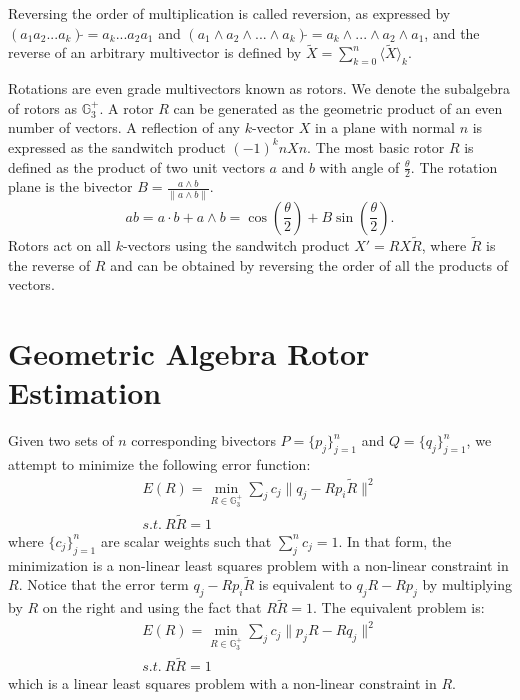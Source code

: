 \documentclass{birkjour}
\numberwithin{equation}{section}
\begin{document}
Reversing the order of multiplication is called reversion, as expressed by $(a_1 a_2 ... a_k)\tilde{} = a_k ... a_2 a_1$ and $(a_1 \wedge a_2 \wedge ... \wedge a_k)\tilde{} = a_k \wedge ... \wedge a_2 \wedge a_1$, and the reverse of an arbitrary multivector is defined by $\tilde{X} = \sum_{k=0}^n { \langle \tilde{X} \rangle_k }$.

Rotations are even grade multivectors known as rotors. We denote the subalgebra of rotors as $\mathbb{G}^{+}_3$. A rotor $R$ can be generated as the geometric product of an even number of vectors. A reflection of any $k$-vector $X$ in a plane with normal $n$ is expressed as the sandwitch product $(-1)^k n X n$. The most basic rotor $R$ is defined as the product of two unit vectors $a$ and $b$ with angle of $\frac{\theta}{2}$. The rotation plane is the bivector $B = \frac{a \wedge b}{\| a \wedge b \|}$.
\begin{equation*}
a b = a \cdot b + a \wedge b = \cos\left( \frac{\theta}{2} \right) + B \sin\left( \frac{\theta}{2} \right).
\end{equation*}
Rotors act on all $k$-vectors using the sandwitch product $X' = R X \tilde R$, where $\tilde R$ is the reverse of $R$ and can be obtained by reversing the order of all the products of vectors.

\section{Geometric Algebra Rotor Estimation}

Given two sets of $n$ corresponding bivectors $P = \{p_j\}_{j=1}^n$ and $Q = \{q_j\}_{j=1}^n$, we attempt to minimize the following error function:
\begin{eqnarray*}
E(R) = \min_{R \in \mathbb{G}^{+}_3 } \sum_j { c_{j} \|q_j - R p_i \tilde R\|^2 }\\
s.t. \ R \tilde R = 1
\end{eqnarray*}
where $\{c_{j}\}_{j=1}^n$ are scalar weights such that $\sum_j^n{c_j} = 1$. In that form, the minimization is a non-linear least squares problem with a non-linear constraint in $R$. Notice that the error term $q_j - R p_i \tilde R$ is equivalent to $q_j R - R p_j$ by multiplying by $R$ on the right and using the fact that $R \tilde R = 1$. The equivalent problem is:
\begin{eqnarray*}
E(R) = \min_{R \in \mathbb{G}^{+}_3 } \sum_j { c_{j} \|p_j R - R q_j\|^2 }\\
s.t. \ R \tilde R = 1
\end{eqnarray*}
which is a linear least squares problem with a non-linear constraint in $R$.
\end{document}
